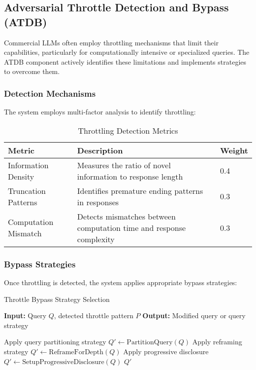 \documentclass[journal,onecolumn]{IEEEtran}
\begin{document}
\subsection{Adversarial Throttle Detection and Bypass (ATDB)}

Commercial LLMs often employ throttling mechanisms that limit their capabilities, particularly for computationally intensive or specialized queries. The ATDB component actively identifies these limitations and implements strategies to overcome them.

\subsubsection{Detection Mechanisms}

The system employs multi-factor analysis to identify throttling:

\begin{table}[ht]
\centering
\caption{Throttling Detection Metrics}
\label{tab:throttle-metrics}
\begin{tabular}{lp{5cm}p{3cm}}
\toprule
\textbf{Metric} & \textbf{Description} & \textbf{Weight} \\
\midrule
Information Density & Measures the ratio of novel information to response length & 0.4 \\
Truncation Patterns & Identifies premature ending patterns in responses & 0.3 \\
Computation Mismatch & Detects mismatches between computation time and response complexity & 0.3 \\
\bottomrule
\end{tabular}
\end{table}

\subsubsection{Bypass Strategies}

Once throttling is detected, the system applies appropriate bypass strategies:

\begin{algorithm}
\caption{Throttle Bypass Strategy Selection}
\begin{algorithmic}[1]
\STATE \textbf{Input:} Query $Q$, detected throttle pattern $P$
\STATE \textbf{Output:} Modified query or query strategy

    \STATE Apply query partitioning strategy
    \STATE $Q' \leftarrow \text{PartitionQuery}(Q)$
    \STATE Apply reframing strategy
    \STATE $Q' \leftarrow \text{ReframeForDepth}(Q)$
    \STATE Apply progressive disclosure
    \STATE $Q' \leftarrow \text{SetupProgressiveDisclosure}(Q)$
\ENDIF
\RETURN $Q'$
\end{algorithmic}
\end{algorithm}
\end{document}
